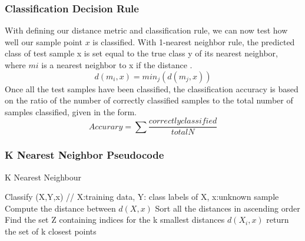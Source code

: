 \documentclass{report}
\begin{document}
\subsubsection*{Classification Decision Rule}
With defining our distance metric and classification rule, we can now test how well our sample point $x$ is classified.
With 1-nearest neighbor rule, the predicted class of test sample x is set equal to the true class y of its nearest neighbor, where $mi$ is a nearest neighbor to x if the distance \cite{7}.
\begin{equation}
d(m_{i},x) = min_{j}(d(m_{j},x))
\end{equation} 
Once all the test samples have been classified, the classification accuracy is based on the ratio of the number of correctly classified samples to the total number of samples classified, given in the form.
\begin{equation}
Accurary = \sum \frac{correctly classified}{total N}
\end{equation}
		


%
%

\subsubsection{K Nearest Neighbor Pseudocode }
\begin{algorithm}
  \caption{K Nearest Neighbour}
  \begin{algorithmic}
  	\State Classify (X,Y,x) // X:training data, Y: class labels of X, x:unknown sample
	\State Compute the distance between $d(X, x)$
	\State Sort all the distances in ascending order
	\EndFor
	\State Find the set Z containing indices for the k smallest distances $d(X_{i},x)$
	\State return the set of k closest points 
  \end{algorithmic}
\end{algorithm}
\end{document}
